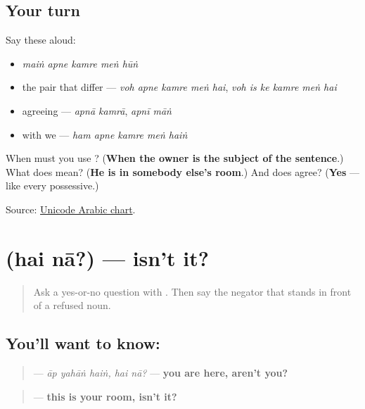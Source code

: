 \subsection*{Your turn}
Say these aloud:

\begin{itemize}
\raggedright
  \item \emph{maiṅ apne kamre meṅ hūṅ}
  \item the pair that differ — \emph{voh apne kamre meṅ hai}, \emph{voh is ke kamre meṅ hai}
  \item agreeing — \emph{apnā kamrā}, \emph{apnī māṅ}
  \item with we — \emph{ham apne kamre meṅ haiṅ}
\end{itemize}

\begin{tcolorbox}[breakable,colback=teal!4,colframe=teal!35!black,title={Before you move on}]
When must you use \textbf{}? (\textbf{When the owner is the subject of the sentence}.) What does \textbf{     } mean? (\textbf{He is in somebody else's room}.) And does \textbf{} agree? (\textbf{Yes} — like every possessive.)

Source: \href{https://www.unicode.org/charts/PDF/U0600.pdf}{Unicode Arabic chart}.
\end{tcolorbox}
\section[\texorpdfstring{\ur{ہے} \ur{نا؟} (hai nā?)}{ہے نا؟ (hai nā?)}]{  (hai nā?) — isn't it?}

\label{lesson:UR-C26-hai-na}



\begin{quote}
Ask a yes-or-no question with \textbf{}. Then say the negator that stands in front of a refused noun.
\end{quote}

\subsection*{You'll want to know:  }
\begin{quote}
\textbf{    } — \emph{āp yahāṅ haiṅ, hai nā?} — \textbf{you are here, aren't you?}
\end{quote}

\begin{quote}
\textbf{      } — \textbf{this is your room, isn't it?}
\end{quote}

